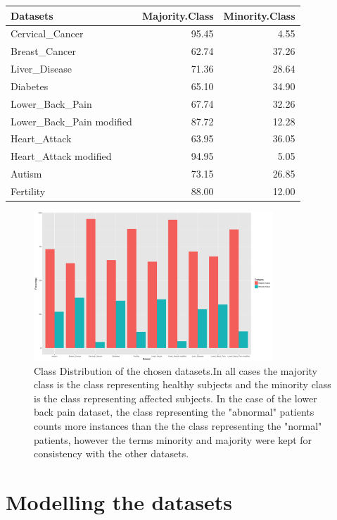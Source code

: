 \begin{table}[H]
\centering
\begin{tabular}{lrr}
  \hline
Datasets & Majority.Class & Minority.Class \\ 
  \hline
Cervical\_Cancer & 95.45 & 4.55 \\ 
  Breast\_Cancer & 62.74 & 37.26 \\ 
  Liver\_Disease & 71.36 & 28.64 \\ 
  Diabetes & 65.10 & 34.90 \\ 
  Lower\_Back\_Pain & 67.74 & 32.26 \\ 
  Lower\_Back\_Pain modified & 87.72 & 12.28 \\ 
  Heart\_Attack & 63.95 & 36.05 \\ 
  Heart\_Attack modified & 94.95 & 5.05 \\ 
  Autism & 73.15 & 26.85 \\ 
  Fertility & 88.00 & 12.00 \\ 
   \hline
\end{tabular}
\end{table}

\begin{figure}[H]
    \centering
    \includegraphics[width=0.8\textwidth]{ThesisTemplate/usingLatex/chapter4Images/figure4_1b.png}
    \caption{Class Distribution of the chosen datasets.\newline In all cases the majority class is the class representing healthy subjects and the minority class is the class representing affected subjects. In the case of the lower back pain dataset, the class representing the "abnormal" patients counts more instances than the the class representing the "normal" patients, however the terms minority and majority were kept for consistency with the other datasets.}
    \label{fig:my_label}
\end{figure}
\section{Modelling the datasets}
